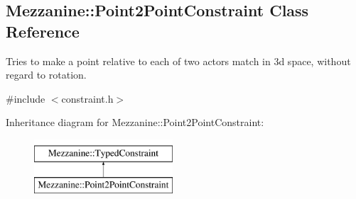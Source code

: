 \hypertarget{classMezzanine_1_1Point2PointConstraint}{
\subsection{Mezzanine::Point2PointConstraint Class Reference}
\label{classMezzanine_1_1Point2PointConstraint}
}


Tries to make a point relative to each of two actors match in 3d space, without regard to rotation.  




{\ttfamily \#include $<$constraint.h$>$}

Inheritance diagram for Mezzanine::Point2PointConstraint:\begin{figure}[H]
\begin{center}
\leavevmode
\includegraphics[height=2.000000cm]{classMezzanine_1_1Point2PointConstraint}
\end{center}
\end{figure}
